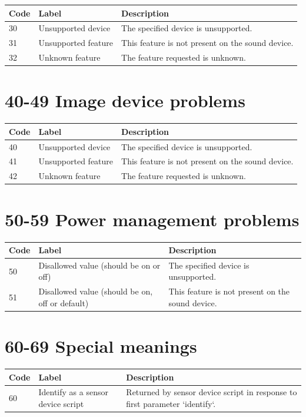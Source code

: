 \documentclass[
]{book}
\begin{document}
\begin{tabular}{l|l|l}
\hline
Code & Label & Description\\
\hline
30 & Unsupported device & The specified device is unsupported.\\
\hline
31 & Unsupported feature & This feature is not present on the sound device.\\
\hline
32 & Unknown feature & The feature requested is unknown.\\
\hline
\end{tabular}

\section{40-49 Image device problems}\label{image-device-problems}

\begin{tabular}{l|l|l}
\hline
Code & Label & Description\\
\hline
40 & Unsupported device & The specified device is unsupported.\\
\hline
41 & Unsupported feature & This feature is not present on the sound device.\\
\hline
42 & Unknown feature & The feature requested is unknown.\\
\hline
\end{tabular}

\section{50-59 Power management problems}\label{power-management-problems}

\begin{tabular}{l|l|l}
\hline
Code & Label & Description\\
\hline
50 & Disallowed value (should be on or off) & The specified device is unsupported.\\
\hline
51 & Disallowed value (should be on, off or default) & This feature is not present on the sound device.\\
\hline
\end{tabular}

\section{60-69 Special meanings}\label{special-meanings}

\begin{tabular}{l|l|l}
\hline
Code & Label & Description\\
\hline
60 & Identify as a sensor device script & Returned by sensor device script in response to first parameter `identify`.\\
\hline
\end{tabular}

  
\end{document}

